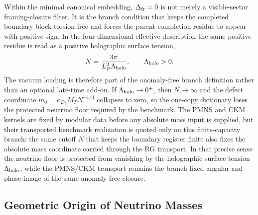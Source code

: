 \documentclass[11pt]{article}
\begin{document}
Within the minimal canonical embedding, $\Delta_{\rm fr}=0$ is not merely a
visible-sector framing-closure filter. It is the branch condition that keeps the
completed boundary block torsion-free and forces the parent completion residue
to appear with positive sign. In the four-dimensional effective description the
same positive residue is read as a positive holographic surface tension,
\begin{equation}
 N = \frac{3\pi}{L_P^2\Lambda_{\rm holo}},
 \qquad
 \Lambda_{\rm holo}>0.
\end{equation}
The vacuum loading is therefore part of the anomaly-free branch definition
rather than an optional late-time add-on. If $\Lambda_{\rm holo}\to0^+$, then
$N\to\infty$ and the defect coordinate
$m_0=\kappa_{D_5}M_PN^{-1/4}$ collapses to zero, so the one-copy dictionary
loses the protected neutrino floor required by the benchmark. The PMNS and CKM
kernels are fixed by modular data before any absolute mass input is supplied,
but their transported benchmark realization is quoted only on this
finite-capacity branch: the same cutoff $N$ that keeps the boundary register
finite also fixes the absolute mass coordinate carried through the RG
transport. In that precise sense the neutrino floor is protected from vanishing
by the holographic surface tension $\Lambda_{\rm holo}$, while the PMNS/CKM
transport remains the branch-fixed angular and phase image of the same
anomaly-free closure.

\subsection{Geometric Origin of Neutrino Masses}
\end{document}
